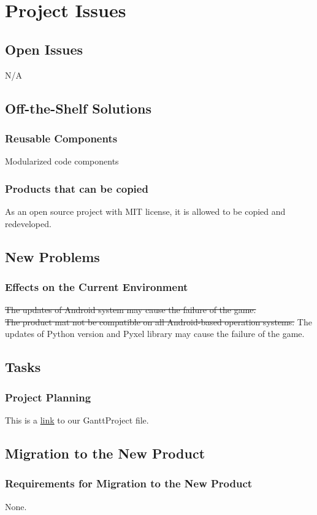 \documentclass[12pt, titlepage]{article}
\begin{document}
\section{Project Issues}

\subsection{Open Issues}
N/A
\subsection{Off-the-Shelf Solutions}
\subsubsection{Reusable Components}
Modularized code components
\subsubsection{Products that can be copied}
As an open source project with MIT license, it is allowed to be copied and redeveloped.
\subsection{New Problems}
\subsubsection{Effects on the Current Environment}
\sout{The updates of Android system may cause the failure of the game.\\
The product mat not be compatible on all Android-based operation systems.} {\color{red} The updates of Python version and Pyxel library may cause the failure of the game.}
\subsection{Tasks}
\subsubsection{Project Planning}
This is a \href{https://gitlab.cas.mcmaster.ca/3XA3_Cloud10/se3xa3/tree/master/shoot_game/ProjectSchedule/}{link} to our GanttProject file.
\subsection{Migration to the New Product}
\subsubsection{Requirements for Migration to the New Product}
None.
\end{document}
